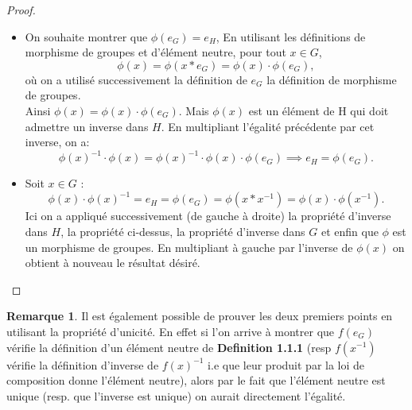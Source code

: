 \documentclass[oneside,12pt,french,table]{book}
\theoremstyle{definition}
\theoremstyle{definition}
\theoremstyle{definition}
\newtheorem*{remark}{Remarque}
\begin{document}
\begin{proof} \hspace{1em}
\begin{itemize}
    \item On souhaite montrer que $\phi(e_G) = e_H$, En utilisant les définitions de morphisme de groupes et d'élément neutre, pour tout $x \in G$, 
    \[\phi(x) = \phi(x * e_G) = \phi(x) \cdot \phi(e_G), \]
    où on a utilisé successivement la définition de $e_G$ la définition de morphisme de groupes. \\
    Ainsi $\phi(x) =  \phi(x) \cdot \phi(e_G)$. Mais $\phi(x)$ est un élément de H qui doit admettre un inverse dans $H$. En multipliant l'égalité précédente par cet inverse, on a:
    \[\phi(x)^{-1} \cdot \phi(x) = \phi(x)^{-1} \cdot \phi(x) \cdot \phi(e_G) \implies e_H = \phi(e_G). \]
    \item Soit $x \in G$ : 
    \[\phi(x) \cdot \phi(x)^{-1} = e_H = \phi(e_G) = \phi(x * x^{-1}) = \phi(x) \cdot \phi(x^{-1}).\]
    Ici on a appliqué successivement (de gauche à droite) la propriété d'inverse dans $H$, la propriété ci-dessus, la propriété d'inverse dans $G$ et enfin que $\phi$ est un morphisme de groupes. En multipliant à gauche par l'inverse de $\phi(x)$ on obtient à nouveau le résultat désiré.
\end{itemize}
\end{proof}
\begin{remark}
Il est également possible de prouver les deux premiers points en utilisant la propriété d'unicité. En effet si l'on arrive à montrer que $f(e_G)$ vérifie la définition d'un élément neutre de \textbf{Definition 1.1.1} (resp $f(x^{-1})$ vérifie la définition d'inverse de $f(x)^{-1}$ i.e que leur produit par la loi de composition donne l'élément neutre), alors par le fait que l'élément neutre est unique (resp. que l'inverse est unique) on aurait directement l'égalité. 
\end{remark}
\end{document}
